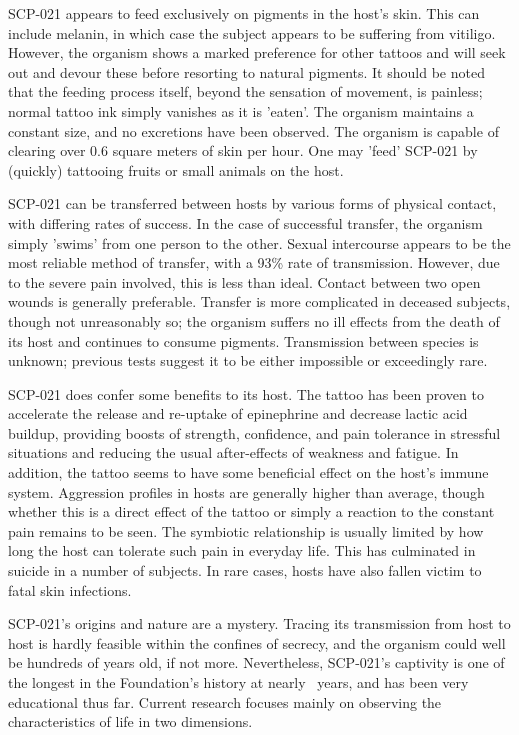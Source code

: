 SCP-021 appears to feed exclusively on pigments in the host's skin. This can include melanin, in which case the subject appears to be suffering from vitiligo. However, the organism shows a marked preference for other tattoos and will seek out and devour these before resorting to natural pigments. It should be noted that the feeding process itself, beyond the sensation of movement, is painless; normal tattoo ink simply vanishes as it is 'eaten'. The organism maintains a constant size, and no excretions have been observed. The organism is capable of clearing over 0.6 square meters of skin per hour. One may 'feed' SCP-021 by (quickly) tattooing fruits or small animals on the host.

SCP-021 can be transferred between hosts by various forms of physical contact, with differing rates of success. In the case of successful transfer, the organism simply 'swims' from one person to the other. Sexual intercourse appears to be the most reliable method of transfer, with a 93\% rate of transmission. However, due to the severe pain involved, this is less than ideal. Contact between two open wounds is generally preferable. Transfer is more complicated in deceased subjects, though not unreasonably so; the organism suffers no ill effects from the death of its host and continues to consume pigments. Transmission between species is unknown; previous tests suggest it to be either impossible or exceedingly rare.

SCP-021 does confer some benefits to its host. The tattoo has been proven to accelerate the release and re-uptake of epinephrine and decrease lactic acid buildup, providing boosts of strength, confidence, and pain tolerance in stressful situations and reducing the usual after-effects of weakness and fatigue. In addition, the tattoo seems to have some beneficial effect on the host's immune system. Aggression profiles in hosts are generally higher than average, though whether this is a direct effect of the tattoo or simply a reaction to the constant pain remains to be seen.
\newpage
The symbiotic relationship is usually limited by how long the host can tolerate such pain in everyday life. This has culminated in suicide in a number of subjects. In rare cases, hosts have also fallen victim to fatal skin infections.

SCP-021's origins and nature are a mystery. Tracing its transmission from host to host is hardly feasible within the confines of secrecy, and the organism could well be hundreds of years old, if not more. Nevertheless, SCP-021's captivity is one of the longest in the Foundation's history at nearly \expunged \  years, and has been very educational thus far. Current research focuses mainly on observing the characteristics of life in two dimensions.
